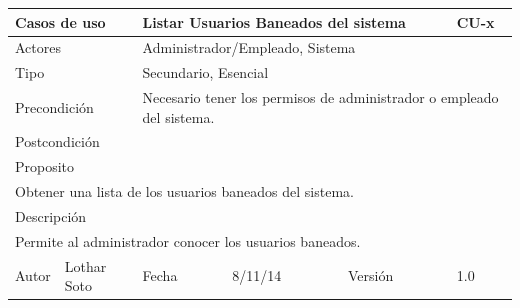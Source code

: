 \documentclass{article}
\begin{document}
\begin{table}[h]
\begin{tabular}{|l|l|l|l|l|l|}
\hline
\multicolumn{2}{|p{2cm}|}{Casos de uso}  & \multicolumn{3}{p{7cm}|}{\textbf{Listar Usuarios Baneados del sistema}} & CU-x \\
\hline
\multicolumn{2}{|p{2cm}|}{Actores}       & \multicolumn{4}{p{8cm}|}{Administrador/Empleado, Sistema}        \\
\hline
\multicolumn{2}{|p{2cm}|}{Tipo}          & \multicolumn{4}{p{8cm}|}{Secundario, Esencial}        \\
\hline
\multicolumn{2}{|p{2cm}|}{Precondición}  & \multicolumn{4}{p{8cm}|}{Necesario tener los permisos de administrador o empleado del sistema.}        \\
\hline
\multicolumn{2}{|p{2cm}|}{Postcondición} & \multicolumn{4}{p{8cm}|}{}        \\
\hline
\multicolumn{6}{|p{10cm}|}{Proposito}                                   \\
\hline
\multicolumn{6}{|p{10cm}|}{Obtener una lista de los usuarios baneados del sistema.}                                            \\
\hline
\multicolumn{6}{|p{10cm}|}{Descripción}                                 \\
\hline
\multicolumn{6}{|p{10cm}|}{Permite al administrador conocer los usuarios baneados.}                                            \\
\hline
Autor          &       Lothar Soto        & Fecha    &  8/11/14   &   Versión  & 1.0\\    
\hline
\end{tabular}
\end{table}
\end{document}

